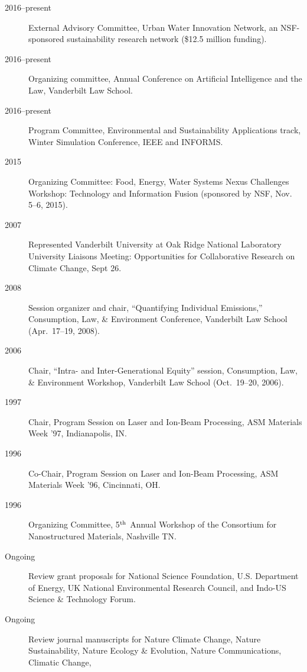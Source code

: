 \documentclass[10pt]{article}
\begin{document}
\begin{description}
            \item[2016--present] External Advisory Committee, Urban Water Innovation Network, an NSF-sponsored sustainability research network (\$12.5 million funding).
            \item[2016--present] Organizing committee, Annual Conference on Artificial Intelligence and the Law, Vanderbilt Law School.
            \item[2016--present] Program Committee, Environmental and Sustainability Applications track, Winter Simulation Conference, IEEE and INFORMS.
            \item[2015] Organizing Committee: Food, Energy, Water Systems Nexus Challenges Workshop: Technology and Information Fusion (sponsored by NSF, Nov. 5--6, 2015).
            \item[2007] Represented Vanderbilt University at Oak Ridge National Laboratory University Liaisons Meeting: Opportunities for Collaborative Research on Climate Change, Sept 26.
            \item[2008] Session organizer and chair, ``Quantifying Individual Emissions,'' Consumption, Law, \& Environment Conference, Vanderbilt Law School (Apr.\ 17--19, 2008).
            \item[2006] Chair, ``Intra- and Inter-Generational Equity'' session, Consumption, Law, \& Environment Workshop, Vanderbilt Law School (Oct.~19--20, 2006).
            \item[1997] Chair, Program Session on Laser and Ion-Beam Processing, ASM Materials Week '97, In\-di\-an\-a\-po\-lis, IN.
            \item[1996] Co-Chair, Program Session on Laser and Ion-Beam Processing, ASM Materials Week '96, Cincinnati, OH.
            \item[1996] Organizing Committee, 5$^{\mbox{\scriptsize th}}$ Annual Workshop of the Consortium for Nanostructured Materials, Nashville TN.
            \item[Ongoing] Review grant proposals for National Science Foundation, U.S. Department of Energy, UK National Environmental Research Council, and Indo-US Science \& Technology Forum.
            \item[Ongoing] Review journal manuscripts for
            Nature Climate Change,
            Nature Sustainability,
            Nature Ecology \& Evolution,
            Nature Communications,
            Climatic Change,

\end{description}
\end{document}
